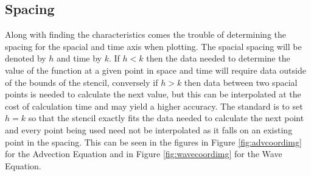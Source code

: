 \subsection{Spacing}
Along with finding the characteristics comes the trouble of determining the spacing for the spacial and time axis when plotting. The spacial spacing will be denoted by $h$ and time by $k$. If $h<k$ then the data needed to determine the value of the function at a given point in space and time will require data outside of the bounds of the stencil, conversely if $h>k$ then data between two spacial points is needed to calculate the next value, but this can be interpolated at the cost of calculation time and may yield a higher accuracy. The standard is to set $h=k$ so that the stencil exactly fits the data needed to calculate the next point and every point being used need not be interpolated as it falls on an existing point in the spacing. This can be seen in the figures in Figure \ref{fig:advcoordimg} for the Advection Equation and in Figure \ref{fig:wavecoordimg} for the Wave Equation.
